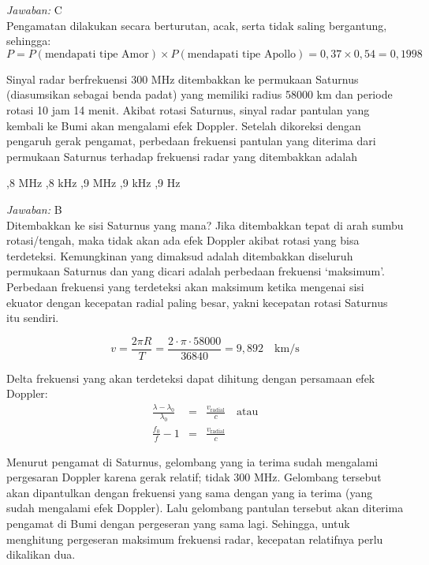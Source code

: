 \documentclass[11pt,fleqn]{exam}
\begin{document}
\begin{questions}
\textit{Jawaban: } C\\

Pengamatan dilakukan secara berturutan, acak, serta tidak saling bergantung, sehingga:
\begin{equation*}
P = P(\text{mendapati tipe Amor}) \times P(\text{mendapati tipe Apollo}) = 0,37 \times 0,54 = 0,1998
\end{equation*}


\question Sinyal radar berfrekuensi 300 MHz ditembakkan ke permukaan Saturnus (diasumsikan sebagai benda padat) yang memiliki radius 58000 km dan periode rotasi 10 jam 14 menit. Akibat rotasi Saturnus, sinyal radar pantulan yang kembali ke Bumi akan mengalami efek Doppler. Setelah dikoreksi dengan pengaruh gerak pengamat, perbedaan frekuensi pantulan yang diterima dari permukaan Saturnus terhadap frekuensi radar yang ditembakkan adalah
\begin{choices}
,8 MHz
,8 kHz
,9 MHz
,9 kHz
,9 Hz
\end{choices}

\textit{Jawaban: } B\\

Ditembakkan ke sisi Saturnus yang mana? Jika ditembakkan tepat di arah sumbu rotasi/tengah, maka tidak akan ada efek Doppler akibat rotasi yang bisa terdeteksi. Kemungkinan yang dimaksud adalah ditembakkan diseluruh permukaan Saturnus dan yang dicari adalah perbedaan frekuensi `maksimum'. Perbedaan frekuensi yang terdeteksi akan maksimum ketika mengenai sisi ekuator dengan kecepatan radial paling besar, yakni kecepatan rotasi Saturnus itu sendiri.

\begin{equation*}
v = \frac{2 \pi R}{T} = \frac{2 \cdot \pi \cdot 58000}{36840} = 9,892 \quad \text{km/s}
\end{equation*}

Delta frekuensi yang akan terdeteksi dapat dihitung dengan persamaan efek Doppler:
\begin{eqnarray*}
\frac{\lambda - \lambda_0}{\lambda_0} &=& \frac{v_{\text{radial}}}{c} \quad \text{atau}\\
\frac{f_0}{f} - 1 &=& \frac{v_{\text{radial}}}{c}
\end{eqnarray*}

Menurut pengamat di Saturnus, gelombang yang ia terima sudah mengalami pergesaran Doppler karena gerak relatif; tidak 300 MHz. Gelombang tersebut akan dipantulkan dengan frekuensi yang sama dengan yang ia terima (yang sudah mengalami efek Doppler). Lalu gelombang pantulan tersebut akan diterima pengamat di Bumi dengan pergeseran yang sama lagi. Sehingga, untuk menghitung pergeseran maksimum frekuensi radar, kecepatan relatifnya perlu dikalikan dua.


\end{questions}
\end{document}

